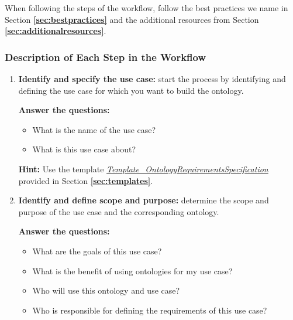 \documentclass{guideline/sty/rapport}
\begin{document}
\begin{beware}[Remark]
When following the steps of the workflow, follow the best practices we name in Section \textbf{\ref{sec:bestpractices}} and the additional resources from Section \textbf{\ref{sec:additionalresources}}.
\end{beware}

\subsubsection{Description of Each Step in the Workflow}
\begin{enumerate}
\item \textcolor{sapphire}{\textbf{Identify and specify the use case:}} start the process by identifying and defining the use case for which you want to build the ontology. \label{step1}

\textbf{Answer the questions:}
\begin{itemize}
    \item What is the name of the use case? 
    \item What is this use case about? 
\end{itemize}

\begin{mdframed}[backgroundcolor=officegreen!8, linecolor=officegreen]
    \begin{minipage}[t]{1\linewidth}
     \textbf{Hint:}
      Use the template \href{https://docs.google.com/document/d/1mkHccxvvGbj3omXubZ_EbM_l7m8LfalJ/edit}{\textit{Template\_OntologyRequirementsSpecification}} provided in Section \textbf{\ref{sec:templates}}.
    \end{minipage}
\end{mdframed}

\item \textcolor{sapphire}{\textbf{Identify and define scope and purpose:}} determine the scope and purpose of the use case and the corresponding ontology. \label{step2}

\textbf{Answer the questions:} 
\begin{itemize}
    \item What are the goals of this use case? 
    \item What is the benefit of using ontologies for my use case?
    \item Who will use this ontology and use case? 
    \item Who is responsible for defining the requirements of this use case?
\end{itemize}



\end{enumerate}
\end{document}
